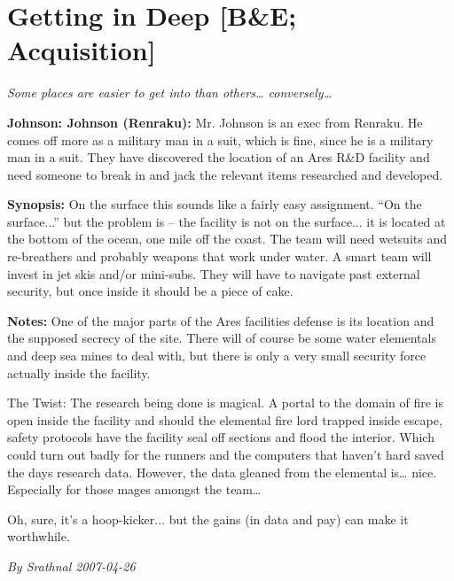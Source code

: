 \documentclass[letterpaper,twocolumn,10.5pt]{article}
\newenvironment{scenario}[6]
	{
		\section{#1 {\small[#2]}}
		\textit{#3}
		\def\TMPSCENARIO{#4 #5}
	}
	{\small\textit{By \TMPSCENARIO}}
\newcommand{\johnson}[2]{\textbf{Johnson: #1 (#2):}}
\newcommand{\synopsis}{\textbf{Synopsis: }}
\newcommand{\notes}{\textbf{Notes: }}
\begin{document}
\begin{scenario}{Getting in Deep}
	{B\&E; Acquisition}
	{Some places are easier to get into than others… conversely… }
	{Srathnal}
	{2007-04-26}
	{https://forum.rpg.net/showthread.php?321504-Shadowrun-4th-101-Instant-Scenarios\&p=7220382#post7220382}

\johnson{Johnson}{Renraku}  Mr. Johnson is an exec from Renraku. He comes off more as a military man in a suit, which is fine, since he is a military man in a suit. They have discovered the location of an Ares R\&D facility and need someone to break in and jack the relevant items researched and developed. 

\synopsis  On the surface this sounds like a fairly easy assignment. ``On the surface...'' but the problem is – the facility is not on the surface... it is located at the bottom of the ocean, one mile off the coast. The team will need wetsuits and re-breathers and probably weapons that work under water. A smart team will invest in jet skis and/or mini-subs. They will have to navigate past external security, but once inside it should be a piece of cake. 

\notes One of the major parts of the Ares facilities defense is its location and the supposed secrecy of the site. There will of course be some water elementals and deep sea mines to deal with, but there is only a very small security force actually inside the facility.

The Twist: The research being done is magical. A portal to the domain of fire is open inside the facility and should the elemental fire lord trapped inside escape, safety protocols have the facility seal off sections and flood the interior. Which could turn out badly for the runners and the computers that haven't hard saved the days research data. However, the data gleaned from the elemental is… nice. Especially for those mages amongst the team…

Oh, sure, it's a hoop-kicker... but the gains (in data and pay) can make it worthwhile. 

\end{scenario}
\end{document}
